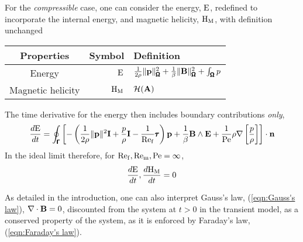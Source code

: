     For the \emph{compressible} case, one can consider the energy, $\mathrm{E}$, redefined to incorporate the internal energy, and magnetic helicity, $\mathrm{H}_{\mathrm{M}}$, with definition unchanged
    \begin{center}\begin{tabular}{ c | r l }
        Properties  &  Symbol  &  Definition  \\
        \hline\hline
        Energy  &  $\mathrm{E}$  &  $\frac{1}{2\rho}\|\mathbf{p}\|_{\pmb{\mathsf{\Omega}}}^{2} + \frac{1}{\beta}\|\mathbf{B}\|_{\pmb{\mathsf{\Omega}}}^{2} + \int_{\pmb{\mathsf{\Omega}}}p$  \\
        Magnetic helicity  &  $\mathrm{H}_{\mathrm{M}}$  &  $\mathcal{H}(\mathbf{A})$
    \end{tabular}\end{center}
     The time derivative for the energy then includes boundary contributions \emph{only}, 
    \begin{equation}
        \frac{d\mathrm{E}}{dt}  =  \oint_{\pmb{\mathsf{\Gamma}}}\left[- \left(\frac{1}{2\rho}\|\mathbf{p}\|^{2}\mathbf{I} + \frac{p}{\rho}\mathbf{I} - \frac{1}{\mathrm{Re}_{\mathrm{f}}}\pmb{\mathsf{\tau}}\right)\mathbf{p} + \frac{1}{\beta}\mathbf{B}\wedge\mathbf{E} + \frac{1}{\mathrm{Pe}}\rho\nabla\left[\frac{p}{\rho}\right]\right]\cdot\mathbf{n}
    \end{equation}
    In the ideal limit therefore, for $\mathrm{Re}_{\mathrm{f}}, \mathrm{Re}_{\mathrm{m}}, \mathrm{Pe}  =  \infty$,
    \begin{equation}
        \frac{d\mathrm{E}}{dt}, \frac{d\mathrm{H}_{\mathrm{M}}}{dt}  =  0
    \end{equation}

    As detailed in the introduction, one can also interpret Gauss's law, (\ref{eqn:Gauss's law}), $\nabla\cdot\mathbf{B}  =  0$, discounted from the system at $t  >  0$ in the transient model, as a conserved property of the system, as it is enforced by Faraday's law, (\ref{eqn:Faraday's law}).
    